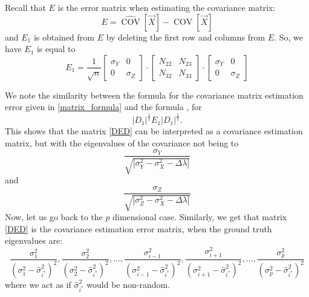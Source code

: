 \documentclass[12pt]{amsart}
\theoremstyle{definition}
\DeclareMathOperator{\Cov}{COV}
\numberwithin{equation}{section}
\numberwithin{equation}{section}
\theoremstyle{remark}
\numberwithin{equation}{section}
\begin{document}
Recall that $E$ is the error matrix when estimating the covariance matrix:
$$E=\hat{\Cov}[\vec{X}]-\Cov[\vec{X}]$$
and $E_1$ is obtained from $E$ by deleting the first row and columns from $E$.
So, we have $E_1$ is equal to
\begin{equation}
\label{matrix_formula}
E_1=
\frac{1}{\sqrt{n}}\left[
\begin{array}{cc}
\sigma_Y&0\\
0&\sigma_Z
\end{array}
\right]\cdot
\left[
\begin{array}{cc}
N_{22}&N_{23}\\
N_{32}& N_{33}
\end{array}\right]
\cdot\left[
\begin{array}{cc}
\sigma_Y&0\\
0&\sigma_Z
\end{array}\right]
\end{equation}

We note the similarity between the formula for the covariance matrix estimation error given in \ref{matrix_formula} and the formula , for
\begin{equation}
\label{DED}
|D_1|^{\frac{1}{2}}E_1 |D_1|^{\frac{1}{2}}.
\end{equation}
This shows that the matrix \ref{DED} can be interpreted as a covariance estimation matrix, but with the eigenvalues
of the covariance not being to
$$\frac{\sigma_Y}{\sqrt{|\sigma_Y^2-\sigma_X^2-\Delta\lambda|}}$$
and
$$\frac{\sigma_Z}{\sqrt{|\sigma_Z^2-\sigma_X^2-\Delta\lambda|}}$$
Now, let us go back to the $p$ dimensional case. Similarly, we get that matrix \ref{DED} is the covariance estimation error matrix,
when the ground truth eigenvalues are:
$$\frac{\sigma^2_1}{(\sigma^2_1-\hat{\sigma}^2_{i^*})^2},\frac{\sigma^2_2}{(\sigma^2_2-\hat{\sigma}^2_{i^*})^2},\ldots,
\frac{\sigma^2_{i-1}}{(\sigma^2_{i-1}-\hat{\sigma}^2_{i^*})^2},\frac{\sigma^2_{i+1}}{(\sigma^2_{i+1}-\hat{\sigma}^2_{i^*})^2},
\ldots,\frac{\sigma^2_p}{(\sigma^2_p-\hat{\sigma}^2_{i^*})^2}$$
	where we act as if $\hat{\sigma}^2_{i^*}$ would be non-random.
\end{document}
